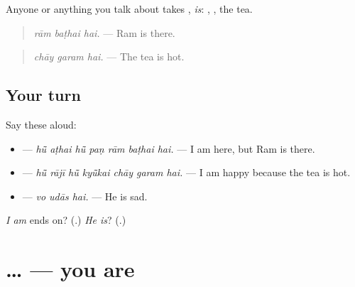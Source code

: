 \begin{grammarlens}[title={Grammar Lens: \mw{है}}]
Anyone or anything you talk about takes \textbf{}, \emph{is}: \textbf{}, \textbf{}, the tea.

\begin{quote}
\textbf{  }
\end{quote}

\begin{quote}
\emph{rām baṭhai hai.} — Ram is there.
\end{quote}

\begin{quote}
\textbf{  }
\end{quote}

\begin{quote}
\emph{chāy garam hai.} — The tea is hot.
\end{quote}
\end{grammarlens}

\subsection*{Your turn}
Say these aloud:

\begin{itemize}
\raggedright
  \item \textbf{      } — \emph{hū̃ aṭhai hū̃ paṇ rām baṭhai hai.} — I am here, but Ram is there.
  \item \textbf{      } — \emph{hū̃ rājī hū̃ kyū̃kai chāy garam hai.} — I am happy because the tea is hot.
  \item \textbf{  } — \emph{vo udās hai.} — He is sad.
\end{itemize}

\begin{tcolorbox}[breakable,colback=teal!4,colframe=teal!35!black,title={Before you move on}]
\emph{I am} ends on? (\textbf{}.) \emph{He is}? (\textbf{}.)
\end{tcolorbox}
\section[\texorpdfstring{\mw{आप} … \mw{हो} (āp … ho)}{आप … हो (āp … ho)}]{ …  — you are}

\label{lesson:MW-C153-aap-ho}



